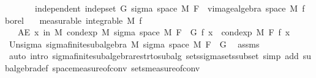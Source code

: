 \begin{isabellebody}
\ \ \ \ \ \ \ independent{\isacharcolon}{\kern0pt}\ {\isachardoublequoteopen}indep{\isacharunderscore}{\kern0pt}set\ G\ {\isacharparenleft}{\kern0pt}sigma\ {\isacharparenleft}{\kern0pt}space\ M{\isacharparenright}{\kern0pt}\ {\isacharparenleft}{\kern0pt}F\ {\isasymunion}\ vimage{\isacharunderscore}{\kern0pt}algebra\ {\isacharparenleft}{\kern0pt}space\ M{\isacharparenright}{\kern0pt}\ f\ borel{\isacharparenright}{\kern0pt}{\isacharparenright}{\kern0pt}{\isachardoublequoteclose}\isanewline
\ \ \ {\isacharbrackleft}{\kern0pt}measurable{\isacharbrackright}{\kern0pt}{\isacharcolon}{\kern0pt}\ {\isachardoublequoteopen}integrable\ M\ f{\isachardoublequoteclose}\isanewline
\ \ \ {\isachardoublequoteopen}AE\ x\ in\ M{\isachardot}{\kern0pt}\ cond{\isacharunderscore}{\kern0pt}exp\ M\ {\isacharparenleft}{\kern0pt}sigma\ {\isacharparenleft}{\kern0pt}space\ M{\isacharparenright}{\kern0pt}\ {\isacharparenleft}{\kern0pt}F\ {\isasymunion}\ G{\isacharparenright}{\kern0pt}{\isacharparenright}{\kern0pt}\ f\ x\ {\isacharequal}{\kern0pt}\ cond{\isacharunderscore}{\kern0pt}exp\ M\ F\ f\ x{\isachardoublequoteclose}\isanewline
%
\isadelimproof
%
\endisadelimproof
%
\isatagproof
{}\isamarkupfalse%
\ {\isacharminus}{\kern0pt}\isanewline
\ \ \isamarkupfalse%
\ Un{\isacharunderscore}{\kern0pt}sigma{\isacharcolon}{\kern0pt}\ sigma{\isacharunderscore}{\kern0pt}finite{\isacharunderscore}{\kern0pt}subalgebra\ M\ {\isachardoublequoteopen}sigma\ {\isacharparenleft}{\kern0pt}space\ M{\isacharparenright}{\kern0pt}\ {\isacharparenleft}{\kern0pt}F\ {\isasymunion}\ G{\isacharparenright}{\kern0pt}{\isachardoublequoteclose}\ \isamarkupfalse%
\ assms{\isacharparenleft}{\kern0pt}{}{\isacharcomma}{\kern0pt}{}{\isacharparenright}{\kern0pt}\ \isamarkupfalse%
\ {\isacharparenleft}{\kern0pt}auto\ intro{\isacharbang}{\kern0pt}{\isacharcolon}{\kern0pt}\ sigma{\isacharunderscore}{\kern0pt}finite{\isacharunderscore}{\kern0pt}subalgebra{\isacharunderscore}{\kern0pt}restr{\isacharunderscore}{\kern0pt}to{\isacharunderscore}{\kern0pt}subalg\ sets{\isachardot}{\kern0pt}sigma{\isacharunderscore}{\kern0pt}sets{\isacharunderscore}{\kern0pt}subset\ simp\ add{\isacharcolon}{\kern0pt}\ subalgebra{\isacharunderscore}{\kern0pt}def\ space{\isacharunderscore}{\kern0pt}measure{\isacharunderscore}{\kern0pt}of{\isacharunderscore}{\kern0pt}conv\ sets{\isacharunderscore}{\kern0pt}measure{\isacharunderscore}{\kern0pt}of{\isacharunderscore}{\kern0pt}conv{\isacharparenright}{\kern0pt}\isanewline

\end{isabellebody}

